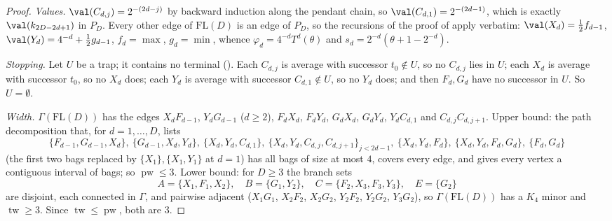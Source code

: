 \begin{proof}
\emph{Values.} $\val(C_{d,j})=2^{-(2d-j)}$ by backward induction along the
pendant chain, so $\val(C_{d,1})=2^{-(2d-1)}$, which is exactly $\val(k_{2D-2d+1})$
in $P_D$. Every other edge of $\mathrm{FL}(D)$ is an edge of $P_D$, so the
recursions of the proof of  apply verbatim:
$\val(X_d)=\tfrac12f_{d-1}$, $\val(Y_d)=4^{-d}+\tfrac12g_{d-1}$,
$f_d=\max$, $g_d=\min$, whence $\varphi_d=4^{-d}T^{d}(\theta)$ and
$s_d=2^{-d}(\theta+1-2^{-d})$.

\emph{Stopping.} Let $U$ be a trap; it contains no terminal
(). Each $C_{d,j}$ is average with successor $t_0\notin U$,
so no $C_{d,j}$ lies in $U$; each $X_d$ is average with successor $t_0$, so no
$X_d$ does; each $Y_d$ is average with successor $C_{d,1}\notin U$, so no $Y_d$
does; and then $F_d,G_d$ have no successor in $U$. So $U=\emptyset$.

\emph{Width.} $\Gamma(\mathrm{FL}(D))$ has the edges $X_dF_{d-1}$, $Y_dG_{d-1}$
($d\ge2$), $F_dX_d$, $F_dY_d$, $G_dX_d$, $G_dY_d$, $Y_dC_{d,1}$ and
$C_{d,j}C_{d,j+1}$. Upper bound: the path decomposition that, for
$d=1,\dots,D$, lists
\[
 \{F_{d-1},G_{d-1},X_d\},\ \{G_{d-1},X_d,Y_d\},\ \{X_d,Y_d,C_{d,1}\},\
 \{X_d,Y_d,C_{d,j},C_{d,j+1}\}_{j<2d-1},\ \{X_d,Y_d,F_d\},\
 \{X_d,Y_d,F_d,G_d\},\ \{F_d,G_d\}
\]
(the first two bags replaced by $\{X_1\},\{X_1,Y_1\}$ at $d=1$) has all bags of
size at most $4$, covers every edge, and gives every vertex a contiguous
interval of bags; so $\operatorname{pw}\le3$. Lower bound: for $D\ge3$ the
branch sets
\[
  A=\{X_1,F_1,X_2\},\quad B=\{G_1,Y_2\},\quad
  C=\{F_2,X_3,F_3,Y_3\},\quad E=\{G_2\}
\]
are disjoint, each connected in $\Gamma$, and pairwise adjacent
($X_1G_1$, $X_2F_2$, $X_2G_2$, $Y_2F_2$, $Y_2G_2$, $Y_3G_2$), so
$\Gamma(\mathrm{FL}(D))$ has a $K_4$ minor and $\operatorname{tw}\ge3$. Since
$\operatorname{tw}\le\operatorname{pw}$, both are $3$.
\end{proof}

